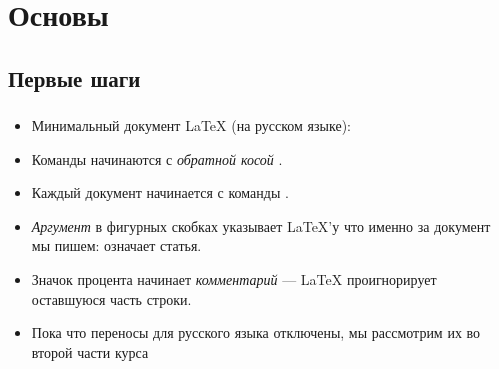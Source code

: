 \documentclass{beamer}
\begin{document}
\section{Основы}

\subsection{Первые шаги}

\begin{frame}[fragile]
\frametitle{\insertsubsection}
\vspace{-2ex}
\begin{itemize}
  \item Минимальный документ \LaTeX{} (на русском языке):

\item Команды начинаются с \emph{обратной косой} \keystrokebftt{\bs}.
\item Каждый документ начинается с команды .
\item \emph{Аргумент} в фигурных скобках \keystrokebftt{\{} \keystrokebftt{\}}
  указывает \LaTeX'у что именно за документ мы пишем:  означает статья.
\item Значок процента \keystrokebftt{\%} начинает \emph{комментарий} --- \LaTeX{}
проигнорирует оставшуюся часть строки.
\item Пока что переносы для русского языка отключены, мы рассмотрим их во
  второй части курса
\end{itemize}
\end{frame}
\end{document}
